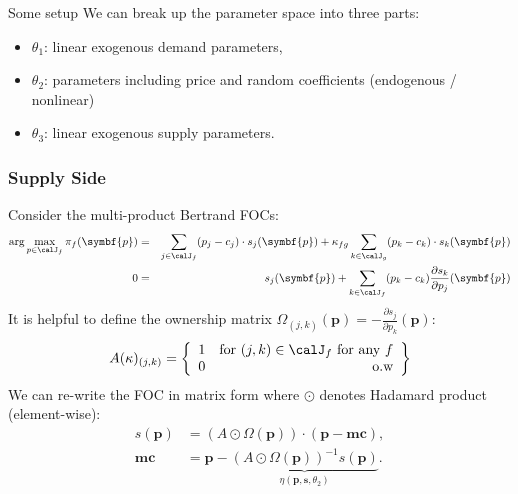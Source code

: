 \begin{frame}{Some setup}
We can break up the parameter space into three parts:
\begin{itemize}
\item $\theta_1$: linear exogenous demand parameters, 
 \item $\theta_2$: parameters including price and random coefficients (endogenous / nonlinear)
 \item $\theta_3$: linear exogenous supply parameters.
\end{itemize}
\end{frame}



\begin{frame}[plain]
\frametitle{Supply Side}
Consider the multi-product Bertrand FOCs:
\footnotesize
{\begin{eqnarray*}
\arg \max_{p \in \calJ_f} \pi_f (\symbf{p}) &=& \sum_{j \in \calJ_f} (p_j - c_j) \cdot s_j(\symbf{p}) +  \kappa_{fg}\sum_{k \in \calJ_g} (p_k - c_k) \cdot s_k(\symbf{p}) \\
0&=& s_j(\symbf{p}) + \sum_{k \in \calJ_f} (p_k - c_k) \frac{\partial s_{k}}{\partial p_j}(\symbf{p}) 
\end{eqnarray*}
}
It is helpful to define the \alert{ownership matrix} $\Omega_{(j,k)}(\symbf{p})  = - \frac{\partial s_{j}}{\partial p_k}(\symbf{p})$:
\begin{eqnarray*}
A(\kappa)_{(j,k)} = \left\{\begin{array}{lr}
          1 & \text{for }  (j,k) \in \calJ_f \text{ for any } f \\ 
	  0 & \text{o.w}\\
        \end{array} \right\}
\end{eqnarray*}
We can re-write the FOC in matrix form where $\odot$ denotes Hadamard product (element-wise):
\begin{eqnarray*}
        s(\symbf{p}) &= (A \odot \Omega(\symbf{p})) \cdot (\symbf{p} - \symbf{mc}), \\
       \symbf{mc} &=  \symbf{p} - \underbrace{(A \odot \Omega(\symbf{p}))^{-1} s(\symbf{p})}_{\eta(\symbf{p},\symbf{s},\theta_2)}.
\end{eqnarray*}
\end{frame}



